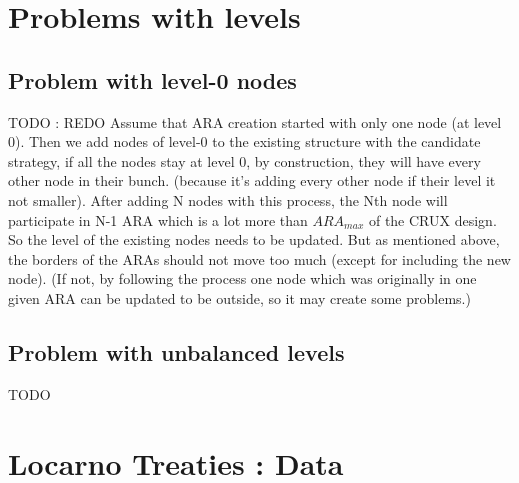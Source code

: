 \documentclass[a4paper,11pt,oneside]{report}
\begin{document}




\cleardoublepage {} {}
\printbibliography


\appendix

\chapter{Problems with levels}
\section{Problem with level-0 nodes} \label{app:levels-zero}
\color{red} TODO : REDO \color{black}
Assume that ARA creation started with only one node (at level 0). Then we add
nodes of level-0 to the existing structure with the candidate strategy, if all
the nodes stay at level 0, by construction, they will have every other node in
their bunch. (because it’s adding every other node if their level it not
smaller). After adding N nodes with this process, the Nth node will participate
in N-1 ARA which is a lot more than $ARA_{max}$ of the CRUX \cite{Basescu2014}
design.  So the level of the existing nodes needs to be updated. But as
mentioned above, the borders of the ARAs should not move too much (except for
including the new node). (If not, by following the process one node which was
originally in one given ARA can be updated to be outside, so it may create some
problems.)

\section{Problem with unbalanced levels } \label{app:unbalanced-levels}

\color{red} TODO  \color{black}

\chapter{Locarno Treaties : Data} \label{app:LocarnoTreaties-data}
\end{document}
